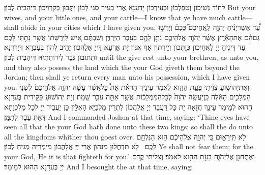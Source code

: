 {לְחוֹד נְשֵׁיכוֹן וְטַפְלְכוֹן וּבְעִירְכוֹן יָדַעְנָא אֲרֵי בְעִיר סַגִּי לְכוֹן יִתְּבוּן בְּקִרְוֵיכוֹן דִּיהַבִית לְכוֹן׃}
{But your wives, and your little ones, and your cattle—I know that ye have much cattle—shall abide in your cities which I have given you;}{}
{עַ֠ד אֲשֶׁר\maqqaf יָנִ֨יחַ יְהֹוָ֥ה \pasek  לַֽאֲחֵיכֶם֮ כָּכֶם֒ וְיָרְשׁ֣וּ גַם\maqqaf הֵ֔ם אֶת\maqqaf הָאָ֕רֶץ אֲשֶׁ֨ר יְהֹוָ֧ה אֱלֹהֵיכֶ֛ם נֹתֵ֥ן לָהֶ֖ם בְּעֵ֣בֶר הַיַּרְדֵּ֑ן וְשַׁבְתֶּ֗ם אִ֚ישׁ לִֽירֻשָּׁת֔וֹ אֲשֶׁ֥ר נָתַ֖תִּי לָכֶֽם׃}
{עַד דִּינִיחַ יְיָ לַאֲחֵיכוֹן כְּוָתְכוֹן וְיֵירְתוּן אַף אִנּוּן יָת אַרְעָא דַּייָ אֱלָהֲכוֹן יָהֵיב לְהוֹן בְּעִבְרָא דְּיַרְדְּנָא וּתְתוּבוּן גְּבַר לִירוּתְּתֵיהּ דִּיהַבִית לְכוֹן׃}
{until the \lord\space give rest unto your brethren, as unto you, and they also possess the land which the \lord\space your God giveth them beyond the Jordan; then shall ye return every man unto his possession, which I have given you.}{}
{וְאֶת\maqqaf יְהוֹשׁ֣וּעַ צִוֵּ֔יתִי בָּעֵ֥ת הַהִ֖וא לֵאמֹ֑ר עֵינֶ֣יךָ הָרֹאֹ֗ת אֵת֩ כׇּל\maqqaf אֲשֶׁ֨ר עָשָׂ֜ה יְהֹוָ֤ה אֱלֹהֵיכֶם֙ לִשְׁנֵי֙ הַמְּלָכִ֣ים הָאֵ֔לֶּה כֵּֽן\maqqaf יַעֲשֶׂ֤ה יְהֹוָה֙ לְכׇל\maqqaf הַמַּמְלָכ֔וֹת אֲשֶׁ֥ר אַתָּ֖ה עֹבֵ֥ר שָֽׁמָּה׃}
{וְיָת יְהוֹשׁוּעַ פַּקֵּידִית בְּעִדָּנָא הַהוּא לְמֵימַר עֵינָךְ חֲזָאָה יָת כָּל דַּעֲבַד יְיָ אֱלָהֲכוֹן לִתְרֵין מַלְכַיָּא הָאִלֵּין כֵּן יַעֲבֵיד יְיָ לְכָל מַלְכְוָתָא דְּאַתְּ עָבַר לְתַמָּן׃}
{And I commanded Joshua at that time, saying: ‘Thine eyes have seen all that the \lord\space your God hath done unto these two kings; so shall the \lord\space do unto all the kingdoms whither thou goest over.}{}
{לֹ֖א תִּֽירָא֑וּם כִּ֚י יְהֹוָ֣ה אֱלֹֽהֵיכֶ֔ם ה֖וּא הַנִּלְחָ֥ם לָכֶֽם׃ \setuma }
{לָא תִדְחֲלוּן מִנְּהוֹן אֲרֵי יְיָ אֱלָהֲכוֹן מֵימְרֵיהּ מְגִיחַ לְכוֹן׃}
{Ye shall not fear them; for the \lord\space your God, He it is that fighteth for you.’}{}
\newseder
{}%
{וָאֶתְחַנַּ֖ן אֶל\maqqaf יְהֹוָ֑ה בָּעֵ֥ת הַהִ֖וא לֵאמֹֽר׃}
{וְצַלִּיתִי קֳדָם יְיָ בְּעִדָּנָא הַהוּא לְמֵימַר׃}
{And I besought the \lord\space at that time, saying:}{}
